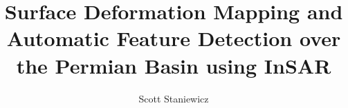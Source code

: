 \documentclass{utexasthesis}
\title{Surface Deformation Mapping and Automatic Feature Detection over the Permian Basin using InSAR}
\author{Scott Staniewicz}
\begin{document}
\maketitle

\begin{dedication}


\end{dedication}


\begin{acknowledgments}

\end{acknowledgments}
\end{document}
